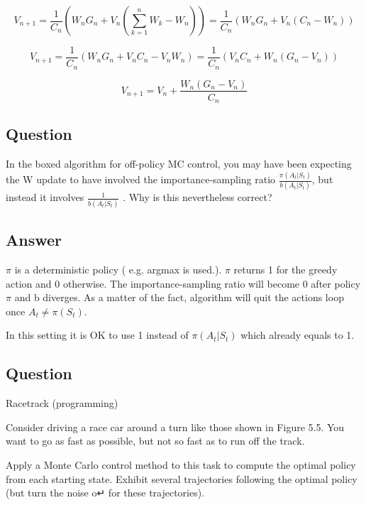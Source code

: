\documentclass[11pt]{article}
\begin{document}
    \begin{equation}
        V_{n+1} = \frac{ 1 }{ C_{n} } ( W_{n} G_{n} + V_{n} (\sum_{k=1}^{n} W_{k} - W_{n}) ) = \frac{ 1 }{ C_{n} } ( W_{n} G_{n} + V_{n} (C_{n} - W_{n}) )
    \end{equation}

    \begin{equation}
        V_{n+1} = \frac{ 1 }{ C_{n} } ( W_{n} G_{n} + V_{n} C_{n} - V_{n}  W_{n} ) = \frac{ 1 }{ C_{n} } ( V_{n} C_{n} + W_{n} ( G_{n} - V_{n} ) )
    \end{equation}

    \begin{equation}
        V_{n+1} = V_{n} +  \frac{ W_{n} ( G_{n} - V_{n} ) }{ C_{n}}
    \end{equation}

    \subsection{Question}

    In the boxed algorithm for off-policy MC control, you may have been expecting the W update to have involved the importance-sampling ratio $ \frac{\pi(A_t|S_t)}{b(A_t|S_t)} $, but instead it involves $ \frac{ 1 }{b(A_t|S_t)} $ .
    Why is this nevertheless correct?

    \subsection*{Answer}

    $\pi$ is a deterministic policy ( e.g. argmax is used.).
    $ \pi $ returns 1 for the greedy action and 0 otherwise.
    The importance-sampling ratio will become 0 after policy $\pi$ and b diverges.
    As a matter of the fact, algorithm will quit the actions loop once $ A_t \neq \pi(S_t)$.

    In this setting it is OK to use 1 instead of $\pi(A_t|S_t)$ which already equals to 1.

    \subsection{Question}

    Racetrack (programming)

    Consider driving a race car around a turn like those shown in Figure 5.5. You want to go as fast as possible, but not so fast as to run off the track.

    Apply a Monte Carlo control method to this task to compute the optimal policy from each starting state.
    Exhibit several trajectories following the optimal policy (but turn the noise o↵ for these trajectories).
\end{document}
